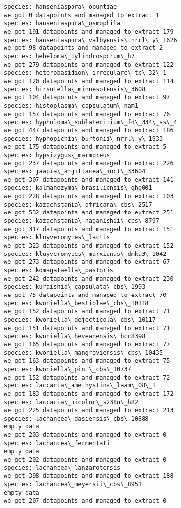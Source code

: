\documentclass[11pt]{article}
\begin{document}
\begin{Verbatim}[commandchars=\\\{\}]
species: hanseniaspora\_opuntiae
we got 0 datapoints and managed to extract 1
species: hanseniaspora\_osmophila
we got 191 datapoints and managed to extract 179
species: hanseniaspora\_valbyensis\_nrrl\_y\_1626
we got 98 datapoints and managed to extract 2
species: hebeloma\_cylindrosporum\_h7
we got 279 datapoints and managed to extract 122
species: heterobasidion\_irregulare\_tc\_32\_1
we got 120 datapoints and managed to extract 114
species: hirsutella\_minnesotensis\_3608
we got 104 datapoints and managed to extract 97
species: histoplasma\_capsulatum\_nam1
we got 157 datapoints and managed to extract 76
species: hypholoma\_sublateritium\_fd\_334\_ss\_4
we got 447 datapoints and managed to extract 186
species: hyphopichia\_burtonii\_nrrl\_y\_1933
we got 175 datapoints and managed to extract 5
species: hypsizygus\_marmoreus
we got 237 datapoints and managed to extract 226
species: jaapia\_argillacea\_mucl\_33604
we got 307 datapoints and managed to extract 141
species: kalmanozyma\_brasiliensis\_ghg001
we got 228 datapoints and managed to extract 103
species: kazachstania\_africana\_cbs\_2517
we got 532 datapoints and managed to extract 251
species: kazachstania\_naganishii\_cbs\_8797
we got 317 datapoints and managed to extract 151
species: kluyveromyces\_lactis
we got 323 datapoints and managed to extract 152
species: kluyveromyces\_marxianus\_dmku3\_1042
we got 273 datapoints and managed to extract 67
species: komagataella\_pastoris
we got 242 datapoints and managed to extract 230
species: kuraishia\_capsulata\_cbs\_1993
we got 75 datapoints and managed to extract 70
species: kwoniella\_bestiolae\_cbs\_10118
we got 152 datapoints and managed to extract 71
species: kwoniella\_dejecticola\_cbs\_10117
we got 151 datapoints and managed to extract 71
species: kwoniella\_heveanensis\_bcc8398
we got 165 datapoints and managed to extract 77
species: kwoniella\_mangroviensis\_cbs\_10435
we got 163 datapoints and managed to extract 75
species: kwoniella\_pini\_cbs\_10737
we got 152 datapoints and managed to extract 72
species: laccaria\_amethystina\_laam\_08\_1
we got 183 datapoints and managed to extract 172
species: laccaria\_bicolor\_s238n\_h82
we got 225 datapoints and managed to extract 213
species: lachancea\_dasiensis\_cbs\_10888
empty data
we got 203 datapoints and managed to extract 0
species: lachancea\_fermentati
empty data
we got 202 datapoints and managed to extract 0
species: lachancea\_lanzarotensis
we got 398 datapoints and managed to extract 188
species: lachancea\_meyersii\_cbs\_8951
empty data
we got 207 datapoints and managed to extract 0

\end{Verbatim}
\end{document}
